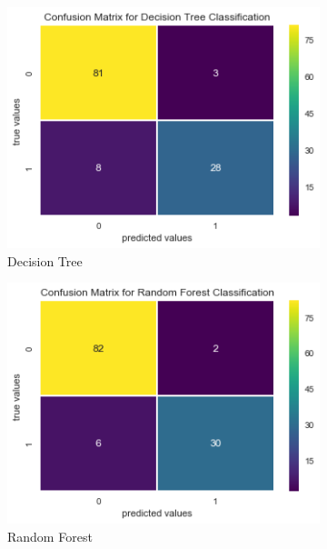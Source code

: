 \documentclass[12pt]{article}
\begin{document}
\begin{sloppypar}
\begin{figure}[H]
\begin{subfigure}[b]{0.48\textwidth}
    \includegraphics[width=\textwidth]{CM_Decison_Tree.png}
    \caption{Decision Tree}
  \end{subfigure}
  \begin{subfigure}[b]{0.48\textwidth}
    \includegraphics[width=\textwidth]{CM_Random_Forest.png}
    \caption{Random Forest}
  \end{subfigure}
    \begin{subfigure}[b]{0.48\textwidth}

\end{subfigure}
\end{figure}
\end{sloppypar}
\end{document}
